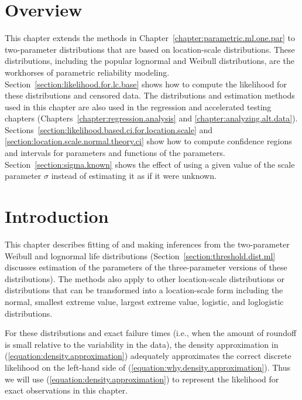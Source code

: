 \section*{Overview}
This chapter extends the methods in
Chapter~\ref{chapter:parametric.ml.one.par} to two-parameter
distributions that are based on location-scale distributions. These
distributions, including the popular lognormal and Weibull
distributions, are the workhorses of parametric reliability modeling.
Section~\ref{section:likelihood.for.lc.base} shows how to compute the
likelihood for these distributions and censored data.  The
distributions and estimation methods used in this chapter are also
used in the regression and accelerated testing chapters
(Chapters~\ref{chapter:regression.analysis} and
\ref{chapter:analyzing.alt.data}).
Sections~\ref{section:likelihood.based.ci.for.location.scale} and
\ref{section:location.scale.normal.theory.ci} show how to compute
confidence regions and intervals for parameters and functions of the
parameters. Section~\ref{section:sigma.known} shows the effect of
using a given value of the scale parameter $\sigma$ instead of
estimating it as if it were unknown.


\section{Introduction}
This chapter describes fitting of and making inferences from the
two-parameter Weibull and lognormal life distributions
(Section~\ref{section:threshold.dist.ml} discusses estimation of
the parameters of the three-parameter versions of these
distributions).  The methods also apply to other location-scale distributions 
or distributions that can be transformed into a location-scale form
including the normal, smallest extreme value, largest extreme value,
logistic, and loglogistic distributions.

For these distributions and exact failure times (i.e., when the amount
of roundoff is small relative to the variability in the data), the
density approximation in (\ref{equation:density.approximation})
adequately approximates the correct discrete likelihood on the
left-hand side of (\ref{equation:why.density.approximation}). Thus we
will use (\ref{equation:density.approximation}) to represent the
likelihood for exact observations in this chapter.

